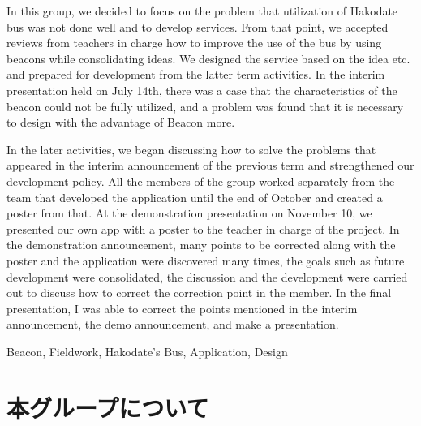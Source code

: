\documentclass[openany,11pt,papersize]{jsbook}
\begin{document}
\begin{eabstract}

 

In this group, we decided to focus on the problem that utilization of Hakodate bus was not done well and to develop services.
From that point, we accepted reviews from teachers in charge how to improve the use of the bus by using beacons while consolidating ideas.
We designed the service based on the idea etc. and prepared for development from the latter term activities.
In the interim presentation held on July 14th, there was a case that the characteristics of the beacon could not be fully utilized, and a problem was found that it is necessary to design with the advantage of Beacon more.

In the later activities, we began discussing how to solve the problems that appeared in the interim announcement of the previous term and strengthened our development policy.
All the members of the group worked separately from the team that developed the application until the end of October and created a poster from that.
At the demonstration presentation on November 10, we presented our own app with a poster to the teacher in charge of the project.
In the demonstration announcement, many points to be corrected along with the poster and the application were discovered many times, the goals such as future development were consolidated, the discussion and the development were carried out to discuss how to correct the correction point in the member.
In the final presentation, I was able to correct the points mentioned in the interim announcement, the demo announcement, and make a presentation.

\begin{ekeyword}
Beacon, Fieldwork, Hakodate's Bus, Application, Design
\end{ekeyword}
\end{eabstract}

  
  \tableofcontents%
  
  
  \mainmatter%
  
  
  
  
  
  
  \chapter{本グループについて}
\end{document}
